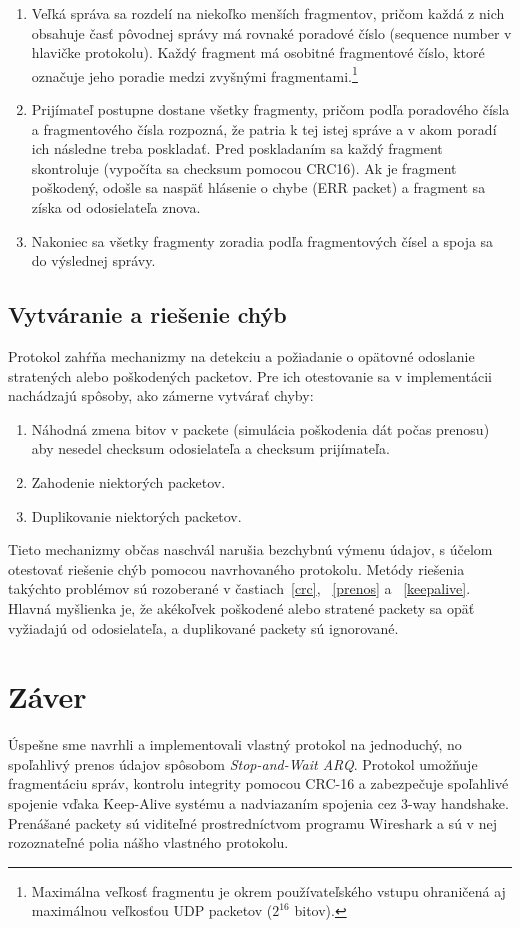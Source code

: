 \documentclass[a4paper,12pt]{article}
\begin{document}
	\begin{enumerate}
		\item Veľká správa sa rozdelí na niekoľko menších fragmentov, pričom každá z nich obsahuje časť pôvodnej správy má rovnaké poradové číslo (sequence number v hlavičke protokolu). Každý fragment má osobitné fragmentové číslo, ktoré označuje jeho poradie medzi zvyšnými fragmentami.\footnote{Maximálna veľkosť fragmentu je okrem používateľského vstupu ohraničená aj maximálnou veľkosťou UDP packetov (${2}^{16}$ bitov).}
		\item Prijímateľ postupne dostane všetky fragmenty, pričom podľa poradového čísla a fragmentového čísla rozpozná, že patria k tej istej správe a v akom poradí ich následne treba poskladať. Pred poskladaním sa každý fragment skontroluje (vypočíta sa checksum pomocou CRC16). Ak je fragment poškodený, odošle sa naspäť hlásenie o chybe (ERR packet) a fragment sa získa od odosielateľa znova.
		\item Nakoniec sa všetky fragmenty zoradia podľa fragmentových čísel a spoja sa do výslednej správy.
	\end{enumerate}


    \subsection{Vytváranie a riešenie chýb}
    Protokol zahŕňa mechanizmy na detekciu a požiadanie o opätovné odoslanie stratených alebo poškodených packetov. Pre ich otestovanie sa v implementácii nachádzajú spôsoby, ako zámerne vytvárať chyby:
	\begin{enumerate}
		\item Náhodná zmena bitov v packete (simulácia poškodenia dát počas prenosu) aby nesedel checksum odosielateľa a checksum prijímateľa.
		\item Zahodenie niektorých packetov.
		\item Duplikovanie niektorých packetov. 
	\end{enumerate}

	Tieto mechanizmy občas naschvál narušia bezchybnú výmenu údajov, s účelom otestovať riešenie chýb pomocou navrhovaného protokolu. Metódy riešenia takýchto problémov sú rozoberané v častiach~\ref{crc}, ~\ref{prenos} a ~\ref{keepalive}. Hlavná myšlienka je, že akékoľvek poškodené alebo stratené packety sa opäť vyžiadajú od odosielateľa, a duplikované packety sú ignorované.


\section{Záver}
	Úspešne sme navrhli a implementovali vlastný protokol na jednoduchý, no spoľahlivý prenos údajov spôsobom \textit{Stop-and-Wait ARQ}. Protokol umožňuje fragmentáciu správ, kontrolu integrity pomocou CRC-16 a zabezpečuje spoľahlivé spojenie vďaka Keep-Alive systému a nadviazaním spojenia cez 3-way handshake. Prenášané packety sú viditeľné prostredníctvom programu Wireshark a sú v nej rozoznateľné polia nášho vlastného protokolu.
\end{document}
